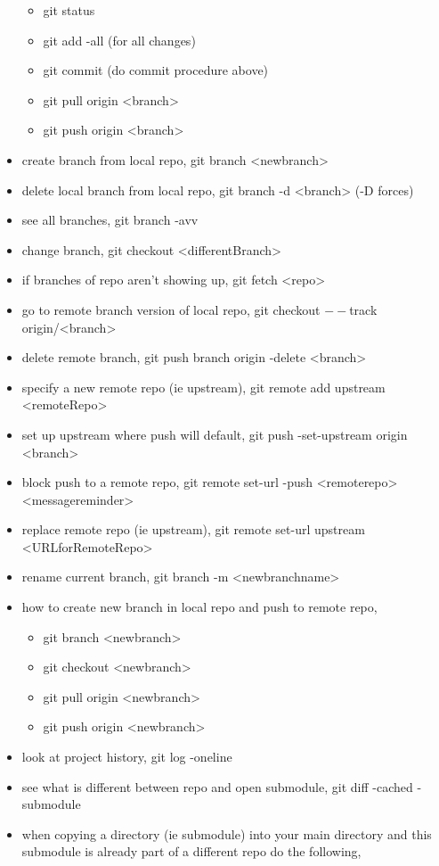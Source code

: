 \documentclass[11pt]{article}
\begin{document}
\begin{itemize}
\begin{itemize}
\item git status
\item git add -all (for all changes)
\item git commit (do commit procedure above)
\item git pull origin <branch>
\item git push origin <branch>
\end{itemize}
\item create branch from local repo, git branch <newbranch>
\item delete local branch from local repo, git branch -d <branch> (-D forces)
\item see all branches, git branch -avv
\item change branch, git checkout <differentBranch>
\item if branches of repo aren't showing up, git fetch <repo>
\item go to remote branch version of local repo, git checkout \(--\)track origin/<branch>
\item delete remote branch, git push branch origin 	-delete <branch>
\item specify a new remote repo (ie upstream), git remote add upstream <remoteRepo>
\item set up upstream where push will default, git push -set-upstream origin <branch>
\item block push to a remote repo, git remote set-url -push <remoterepo> <messagereminder>
\item replace remote repo (ie upstream), git remote set-url upstream <URLforRemoteRepo>
\item rename current branch, git branch -m <newbranchname>
\item how to create new branch in local repo and push to remote repo,
\begin{itemize}
\item git branch <newbranch>
\item git checkout <newbranch>
\item git pull origin <newbranch>
\item git push origin <newbranch>
\end{itemize}
\item look at project history, git log -oneline
\item see what is different between repo and open submodule, git diff -cached -submodule
\item when copying a directory (ie submodule) into your main directory and this submodule is already part of a different repo do the following,

\end{itemize}
\end{document}
